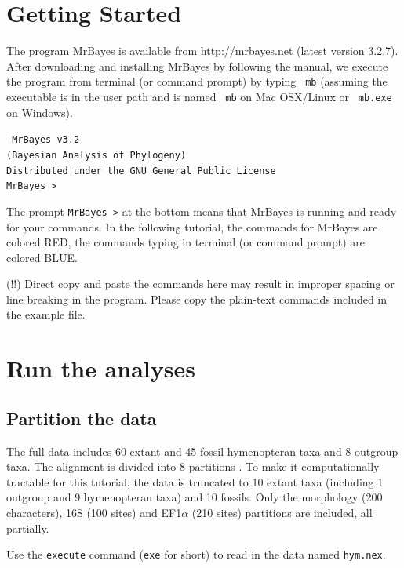 \documentclass[12pt]{article}
\begin{document}
\section{Getting Started}

The program MrBayes is available from \url{http://mrbayes.net} (latest version 3.2.7).
After downloading and installing MrBayes by following the manual, we execute the program from terminal (or command prompt) by typing {\tt \color{blue} mb}
(assuming the executable is in the user path and is named {\tt \color{blue} mb} on Mac OSX/Linux or {\tt \color{blue} mb.exe} on Windows).

{\tt \center
                        MrBayes v3.2 \\
               (Bayesian Analysis of Phylogeny)\\
        Distributed under the GNU General Public License\\
MrBayes >
}

The prompt {\tt MrBayes >} at the bottom means that MrBayes is running and ready for your commands.
In the following tutorial, the commands for MrBayes are colored {\color{red} RED}, the commands typing in terminal (or command prompt) are colored {\color{blue} BLUE}.

{\noindent \color{red} (!!)}
Direct copy and paste the commands here may result in improper spacing or line breaking in the program. Please copy the plain-text commands included in the example file.

\section{Run the analyses}
\subsection{Partition the data}

The full data includes 60 extant and 45 fossil hymenopteran taxa and 8 outgroup taxa. The alignment is divided into 8 partitions \citep{Ronquist:2012ea}.
To make it computationally tractable for this tutorial, the data is truncated to 10 extant taxa (including 1 outgroup and 9 hymenopteran taxa) and 10 fossils.
Only the morphology (200 characters), 16S (100 sites) and EF1$\alpha$ (210 sites) partitions are included, all partially.

Use the {\tt execute} command ({\tt exe} for short) to read in the data named {\tt hym.nex}.
\end{document}
